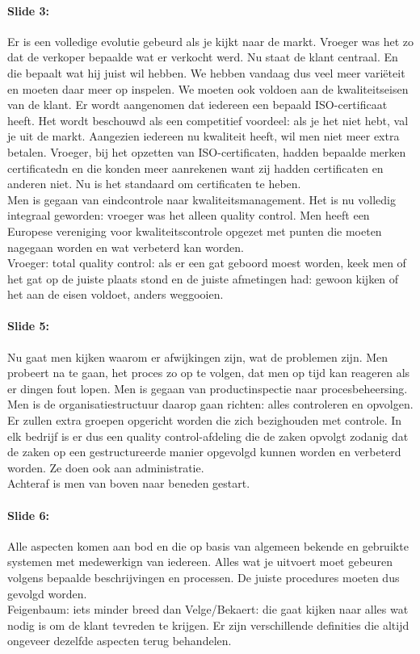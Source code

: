 \documentclass[10pt,a4paper]{report}
\begin{document}
\paragraph{Slide 3:} Er is een volledige evolutie gebeurd als je kijkt naar de markt. Vroeger was het zo dat de verkoper bepaalde wat er verkocht werd. Nu staat de klant centraal. En die bepaalt wat hij juist wil hebben. We hebben vandaag dus veel meer vari\"eteit en moeten daar meer op inspelen. We moeten ook voldoen aan de kwaliteitseisen van de klant. Er wordt aangenomen dat iedereen een bepaald ISO-certificaat heeft. Het wordt beschouwd als een competitief voordeel: als je het niet hebt, val je uit de markt. Aangezien iedereen nu kwaliteit heeft, wil men niet meer extra betalen. Vroeger, bij het opzetten van ISO-certificaten, hadden bepaalde merken certificatedn en die konden meer aanrekenen want zij hadden certificaten en anderen niet. Nu is het standaard om certificaten te heben. \\
Men is gegaan van eindcontrole naar kwaliteitsmanagement. Het is nu volledig integraal geworden: vroeger was het alleen quality control. Men heeft een Europese vereniging voor kwaliteitscontrole opgezet met punten die moeten nagegaan worden en wat verbeterd kan worden.\\
Vroeger: total quality control: als er een gat geboord moest worden, keek men of het gat op de juiste plaats stond en de juiste afmetingen had: gewoon kijken of het aan de eisen voldoet, anders weggooien.

\paragraph{Slide 5:} Nu gaat men kijken waarom er afwijkingen zijn, wat de problemen zijn. Men probeert na te gaan, het proces zo op te volgen, dat men op tijd kan reageren als er dingen fout lopen. Men is gegaan van productinspectie naar procesbeheersing. \\
Men is de organisatiestructuur daarop gaan richten: alles controleren en opvolgen. Er zullen extra groepen opgericht worden die zich bezighouden met controle. In elk bedrijf is er dus een quality control-afdeling die de zaken opvolgt zodanig dat de zaken op een gestructureerde manier opgevolgd kunnen worden en verbeterd worden. Ze doen ook aan administratie. \\
Achteraf is men van boven naar beneden gestart.

\paragraph{Slide 6:} Alle aspecten komen aan bod en die op basis van algemeen bekende en gebruikte systemen met medewerkign van iedereen. Alles wat je uitvoert moet gebeuren volgens bepaalde beschrijvingen en processen. De juiste procedures moeten dus gevolgd worden.\\
Feigenbaum: iets minder breed dan Velge/Bekaert: die gaat kijken naar alles wat nodig is om de klant tevreden te krijgen. Er zijn verschillende definities die altijd ongeveer dezelfde aspecten terug behandelen.
\end{document}
